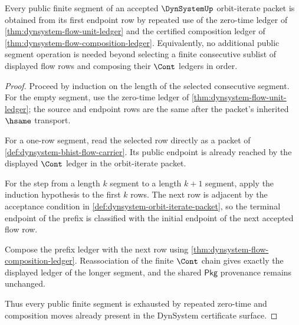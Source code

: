 \begin{theorem}
\label{thm:dynsystem-flow-segment-exhaustion}
Every public finite segment of an accepted $\DynSystemUp$ orbit-iterate packet is obtained from its first endpoint row by repeated use of the zero-time ledger of \autoref{thm:dynsystem-flow-unit-ledger} and the certified composition ledger of \autoref{thm:dynsystem-flow-composition-ledger}. Equivalently, no additional public segment operation is needed beyond selecting a finite consecutive sublist of displayed flow rows and composing their $\Cont$ ledgers in order.
\end{theorem}
\begin{proof}
Proceed by induction on the length of the selected consecutive segment. For the empty segment, use the zero-time ledger of \autoref{thm:dynsystem-flow-unit-ledger}; the source and endpoint rows are the same after the packet's inherited $\hsame$ transport.

For a one-row segment, read the selected row directly as a packet of \autoref{def:dynsystem-bhist-flow-carrier}. Its public endpoint is already reached by the displayed $\Cont$ ledger in the orbit-iterate packet.

For the step from a length $k$ segment to a length $k+1$ segment, apply the induction hypothesis to the first $k$ rows. The next row is adjacent by the acceptance condition in \autoref{def:dynsystem-orbit-iterate-packet}, so the terminal endpoint of the prefix is classified with the initial endpoint of the next accepted flow row.

Compose the prefix ledger with the next row using \autoref{thm:dynsystem-flow-composition-ledger}. Reassociation of the finite $\Cont$ chain gives exactly the displayed ledger of the longer segment, and the shared $\mathsf{Pkg}$ provenance remains unchanged.

Thus every public finite segment is exhausted by repeated zero-time and composition moves already present in the DynSystem certificate surface.
\end{proof}

